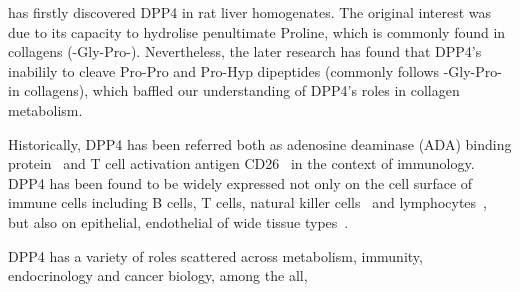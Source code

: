 \citet{Hopsu-Havu1966} has firstly discovered DPP4 in rat liver homogenates. The original interest was due to its capacity to hydrolise penultimate Proline, which is commonly found in collagens (-Gly-Pro-). Nevertheless, the later research has found that DPP4's inabilily to cleave Pro-Pro and Pro-Hyp dipeptides (commonly follows -Gly-Pro- in collagens), which baffled our understanding of DPP4's roles in collagen metabolism.
\par
Historically, DPP4 has been referred both as adenosine deaminase (ADA) binding protein~\cite{Kameoka_1993} and T cell activation antigen CD26~\cite{Fleischer_1994} in the context of immunology. DPP4 has been found to be widely expressed not only on the cell surface of immune cells including B cells, T cells, natural killer cells~\cite{Fleischer1987,Fleischer1988,Gorrell1991,Capuani2018,Bühling1994,Bühling1995} and lymphocytes~\cite{Gorvel1991}, but also on epithelial, endothelial of wide tissue types~\cite{Gorrell2001}. 
\par 
DPP4 has a variety of roles scattered across metabolism, immunity, endocrinology and cancer biology, among the all, 